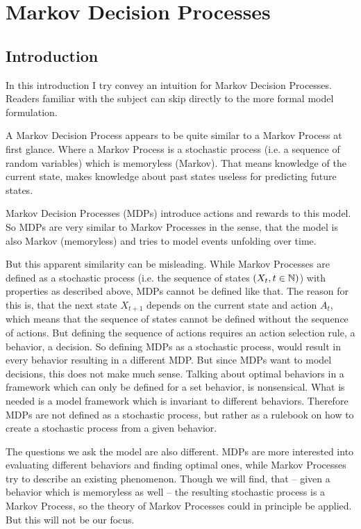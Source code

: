 
\chapter{Markov Decision Processes}
\section{Introduction}
In this introduction I try convey an intuition for Markov Decision Processes. Readers familiar with the subject can skip directly to the more formal model formulation. 

A Markov Decision Process appears to be quite similar to a Markov Process at first glance. Where a Markov Process is a stochastic process (i.e. a sequence of random variables) which is memoryless (Markov). That means knowledge of the current state, makes knowledge about past states useless for predicting future states.

Markov Decision Processes (MDPs) introduce actions and rewards to this model. So MDPs are very similar to Markov Processes in the sense, that the model is also Markov (memoryless) and tries to model events unfolding over time. 

But this apparent similarity can be misleading. While Markov Processes are defined as a stochastic process (i.e. the sequence of states \((X_t,t\in\mathbb{N})\)) with properties as described above, MDPs cannot be defined like that. The reason for this is, that the next state \(X_{t+1}\) depends on the current state and action \(A_{t}\), which means that the sequence of states cannot be defined without the sequence of actions. But defining the sequence of actions requires an action selection rule, a behavior, a decision. So defining MDPs as a stochastic process, would result in every behavior resulting in a different MDP. But since MDPs want to model decisions, this does not make much sense. Talking about optimal behaviors in a framework which can only be defined for a set behavior, is nonsensical. What is needed is a model framework which is invariant to different behaviors. Therefore MDPs are not defined as a stochastic process, but rather as a rulebook on how to create a stochastic process from a given behavior. 

The questions we ask the model are also different.  MDPs are more interested into evaluating different behaviors and finding optimal ones, while Markov Processes try to describe an existing phenomenon. Though we will find, that -- given a behavior which is memoryless as well -- the resulting stochastic process is a Markov Process, so the theory of Markov Processes could in principle be applied. But this will not be our focus. 

